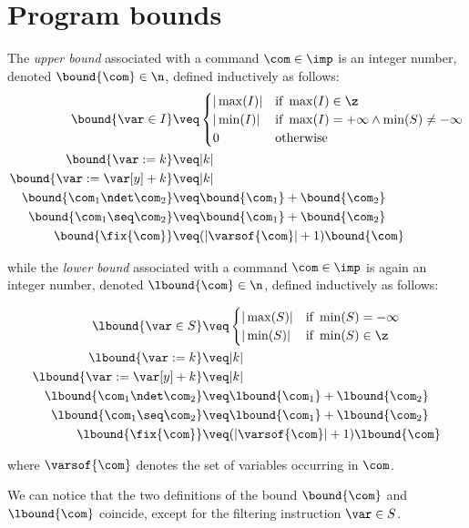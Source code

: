 \section{Program bounds}
\label{sec:bounds}

\begin{definition}\label{def:bound}
  The \emph{upper bound} associated with a command \(\com\in \imp\) is
  an integer number, denoted \(\bound{\com}\in \n\), defined
  inductively as follows:
  \begin{align*}
    \bound{\var \in I}  
    & \veq \begin{cases}
      |\max(I)| & \text{if } \max(I)\in\z \\
      |\min(I)| & \text{if } \max(I)=+\infty \land \min(S) \neq -\infty\\
      0 & \text{otherwise}
    \end{cases}
    \\
    \bound{\var := k} 
    & \veq | k |\\
    \bound{\var := \var[y] + k}
    & \veq | k |\\
    \bound{\com_1 \ndet \com_2}
    & \veq \bound{\com_1} + \bound{\com_2}\\
    \bound{\com_1 \seq \com_2}
    & \veq \bound{\com_1} + \bound{\com_2}\\
    \bound{\fix{\com}}
    & \veq (|\varsof{\com}|+1) \bound{\com} \\ 
  \end{align*}

  while the \emph{lower bound} associated with a command
  \(\com\in \imp\) is again an integer number, denoted
  \(\lbound{\com}\in \n\), defined inductively as follows:

  \begin{align*}
    \lbound{\var \in S}  
    & \veq \begin{cases}
      |\max(S)| & \text{if } \min(S)=-\infty\\
      |\min(S)| & \text{if } \min(S)\in \z
    \end{cases}
    \\
    \lbound{\var := k} 
    & \veq | k |\\
    \lbound{\var := \var[y] + k}
    & \veq | k |\\
    \lbound{\com_1 \ndet \com_2}
    & \veq \lbound{\com_1} + \lbound{\com_2}\\
    \lbound{\com_1 \seq \com_2}
    & \veq \lbound{\com_1} + \lbound{\com_2}\\
    \lbound{\fix{\com}}
    & \veq (|\varsof{\com}|+1) \lbound{\com} \\ 
  \end{align*}

  where \(\varsof{\com}\) denotes the set of variables occurring in 
  \(\com\).
\end{definition}

We can notice that the two definitions of the bound \(\bound{\com}\)
and \(\lbound{\com}\) coincide, except for the filtering instruction
\(\var\in S\).
